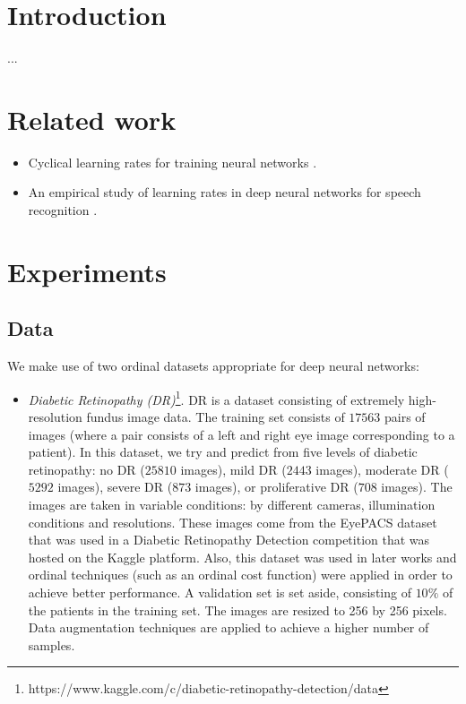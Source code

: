 \documentclass[10pt, a4paper, titlepage]{article}
\begin{document}
	\selectfont
	
	\begin{multicols}{2}
		
	\section{Introduction}
	...
		
	\section{Related work}
	\begin{itemize}
		\item Cyclical learning rates for training neural networks \cite{smith2017cyclical}.
		\item An empirical study of learning rates in deep neural networks for speech recognition \cite{senior2013empirical}.
	\end{itemize}

	
	\section{Experiments}
	\subsection{Data}
	We make use of two ordinal datasets appropriate for deep neural networks:
	
	\begin{itemize}
		\item \textit{Diabetic Retinopathy (DR)}\footnote{https://www.kaggle.com/c/diabetic-retinopathy-detection/data}. DR is a dataset consisting of extremely high-resolution fundus image data. The training set consists of $17563$ pairs of images (where a  pair consists of a left and right eye image corresponding to a patient). In this dataset, we try and predict from five levels of diabetic retinopathy: no DR ($25810$ images), mild DR ($2443$ images), moderate DR ($5292$ images), severe DR ($873$ images), or proliferative DR ($708$ images). The images are taken in variable conditions: by different cameras, illumination conditions and resolutions. These images come from the EyePACS dataset that was used in a Diabetic Retinopathy Detection competition that was hosted on the Kaggle platform. Also, this dataset was used in later works \cite{de2018weighted} and ordinal techniques (such as an ordinal cost function) were applied in order to achieve better performance. A validation set is set aside, consisting of $10\%$ of the patients in the training set. The images are resized to 256 by 256 pixels. Data augmentation techniques are applied to achieve a higher number of samples.
		

\end{itemize}
\end{multicols}
\end{document}

